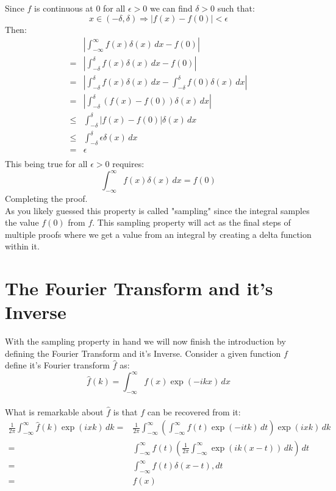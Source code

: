 \documentclass[12pt]{report}
\begin{document}
Since $f$ is continuous at $0$ for all $\epsilon > 0$ we can find $\delta > 0$ such that:
\[x \in (-\delta,\delta) \Rightarrow |f(x)-f(0)| < \epsilon\]
Then:
\begin{equation*}
\begin{aligned}
	&\left|\int_{-\infty}^{\infty}f(x)\delta(x)\,dx-f(0)\right| \\
	=&\left|\int_{-\delta}^{\delta}f(x)\delta(x)\,dx-f(0)\right| \\
	=&\left|\int_{-\delta}^{\delta}f(x)\delta(x)\,dx-\int_{-\delta}^{\delta}f(0)\delta(x)\,dx\right| \\
	=&\left|\int_{-\delta}^{\delta}(f(x)-f(0))\delta(x)\,dx\right| \\
	\leq&\int_{-\delta}^{\delta}|f(x)-f(0)|\delta(x)\,dx \\
	\leq&\int_{-\delta}^{\delta}\epsilon\delta(x)\,dx \\
	=&\epsilon \\
\end{aligned}
\end{equation*}
This being true for all $\epsilon>0$ requires:
	\[\int_{-\infty}^{\infty}f(x)\delta(x)\,dx = f(0)\]
Completing the proof.
\\

As you likely guessed this property is called "sampling" since the integral samples the value $f(0)$ from $f$.
This sampling property will act as the final steps of multiple proofs where we get a value from an integral by creating a delta function within it.

\section{The Fourier Transform and it's Inverse}
With the sampling property in hand we will now finish the introduction by defining the Fourier Transform and it's Inverse.
Consider a given function $f$ define it's Fourier transform $\hat{f}$ as:
\[\hat{f}(k) = \int_{-\infty}^{\infty}f(x)\exp(-ikx)\,dx\]
\\

What is remarkable about $\hat{f}$ is that $f$ can be recovered from it:
\label{sec:inv-trans}
\begin{equation*}
\begin{aligned}
	\frac{1}{2\pi}\int_{-\infty}^{\infty}\hat{f}(k)\exp(ixk)\,dk 
	=& \frac{1}{2\pi}\int_{-\infty}^{\infty}\left(\int_{-\infty}^{\infty}f(t)\exp(-itk)\,dt\right)\exp(ixk)\,dk \\
	=& \int_{-\infty}^{\infty}f(t)\left(\frac{1}{2\pi}\int_{-\infty}^{\infty}\exp(ik(x-t))\,dk\right)\,dt \\
	=& \int_{-\infty}^{\infty}f(t)\delta(x-t),dt \\
	=& f(x) \\
\end{aligned}
\end{equation*}
\end{document}
